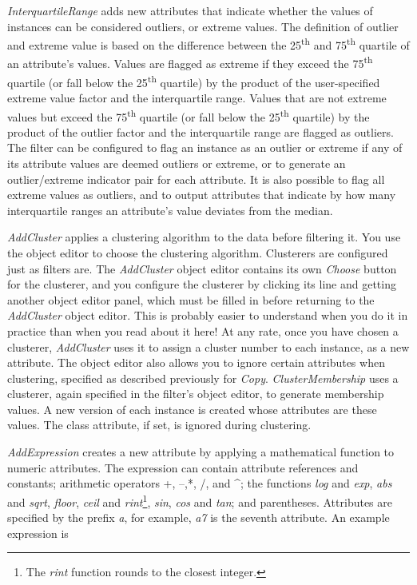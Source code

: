 \textit{InterquartileRange} adds new attributes that indicate whether
the values of instances can be considered outliers, or extreme
values. The definition of outlier and extreme value is based on the
difference between the 25\textsuperscript{th} and
75\textsuperscript{th} quartile of an attribute's values. Values are
flagged as extreme if they exceed the 75\textsuperscript{th} quartile
(or fall below the 25\textsuperscript{th} quartile) by the product of
the user-specified extreme value factor and the interquartile
range. Values that are not extreme values but exceed the
75\textsuperscript{th} quartile (or fall below the
25\textsuperscript{th} quartile) by the product of the outlier factor
and the interquartile range are flagged as outliers. The filter can be
configured to flag an instance as an outlier or extreme if any of its
attribute values are deemed outliers or extreme, or to generate an
outlier/extreme indicator pair for each attribute. It is also possible
to flag all extreme values as outliers, and to output attributes that
indicate by how many interquartile ranges an attribute's value
deviates from the median.

\textit{AddCluster} applies a clustering algorithm to the data before
filtering it. You use the object editor to choose the clustering
algorithm. Clusterers are configured just as filters are. The
\textit{AddCluster} object editor contains its own \textit{Choose}
button for the clusterer, and you configure the clusterer by clicking
its line and getting another object editor panel, which must be filled
in before returning to the \textit{AddCluster} object editor. This is
probably easier to understand when you do it in practice than when you
read about it here! At any rate, once you have chosen a
clusterer, \textit{AddCluster} uses it to assign a cluster number to
each instance, as a new attribute. The object editor also allows you
to ignore certain attributes when clustering, specified as described
previously for \textit{Copy}. \textit{ClusterMembership} uses a
clusterer, again specified in the filter's object editor, to generate
membership values. A new version of each instance is created whose
attributes are these values. The class attribute, if set, is ignored
during clustering.

\textit{AddExpression} creates a new attribute by applying a
mathematical function to numeric attributes. The expression can
contain attribute references and constants; arithmetic operators +,
--,*, /, and \string^; the functions \textit{log} and \textit{exp},
\textit{abs} and \textit{sqrt}, \textit{floor}, \textit{ceil} and
\textit{rint}\footnote{The \textit{rint} function rounds to the
  closest integer.}, \textit{sin}, \textit{cos} and \textit{tan}; and
parentheses. Attributes are specified by the prefix \textit{a}, for
example, \textit{a7} is the seventh attribute. An example expression
is \newline

